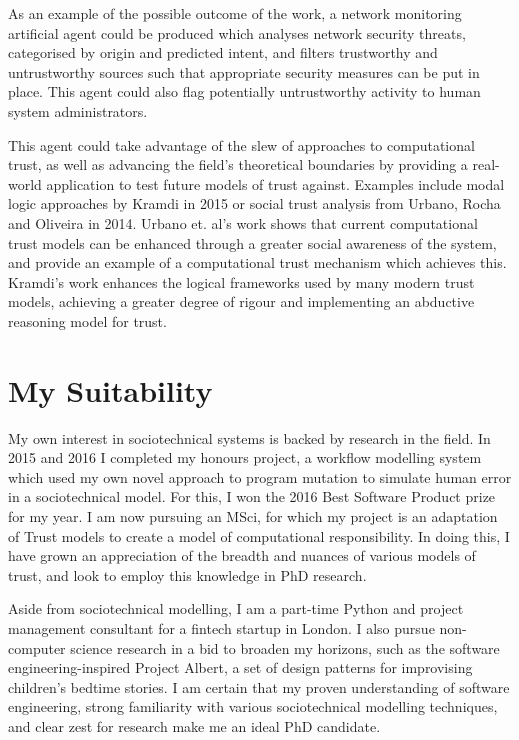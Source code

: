 \documentclass{tufte-handout}
\begin{document}
As an example of the possible outcome of the work, a network monitoring artificial agent could be produced which analyses network security threats, categorised by origin and predicted intent, and filters trustworthy and untrustworthy sources such that appropriate security measures can be put in place. This agent could also flag potentially untrustworthy activity to human system administrators.\par

This agent could take advantage of the slew of approaches to computational trust, as well as advancing the field's theoretical boundaries by providing a real-world application to test future models of trust against. Examples include modal logic approaches by Kramdi in 2015\cite{Kramdi} or social trust analysis from Urbano, Rocha and Oliveira in 2014\cite{Urbano2014}. Urbano et. al's work shows that current computational trust models can be enhanced through a greater social awareness of the system, and provide an example of a computational trust mechanism which achieves this. Kramdi's work enhances the logical frameworks used by many modern trust models, achieving a greater degree of rigour and implementing an abductive reasoning model for trust.\par

\section{My Suitability}
My own interest in sociotechnical systems is backed by research in the field. In 2015 and 2016 I completed my honours project, a workflow modelling system which used my own novel approach to program mutation to simulate human error in a sociotechnical model. For this, I won the 2016 Best Software Product prize for my year. I am now pursuing an MSci, for which my project is an adaptation of Trust models to create a model of computational responsibility. In doing this, I have grown an appreciation of the breadth and nuances of various models of trust, and look to employ this knowledge in PhD research.\par

Aside from sociotechnical modelling, I am a part-time Python and project management consultant for a fintech startup in London. I also pursue non-computer science research in a bid to broaden my horizons, such as the software engineering-inspired Project Albert, a set of design patterns for improvising children's bedtime stories. I am certain that my proven understanding of software engineering, strong familiarity with various sociotechnical modelling techniques, and clear zest for research make me an ideal PhD candidate.\par


\end{document}
